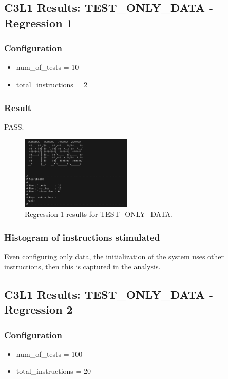 \subsection{C3L1 Results: TEST\_ONLY\_DATA - Regression 1}

\subsubsection{Configuration}

\begin{itemize}
    \item num\_of\_tests = 10
    \item total\_instructions = 2
\end{itemize}

\subsubsection{Result}
PASS.

\begin{figure}[H]
    \centering
    \includegraphics[width=0.47\textwidth]{./c3l1_img/tod_10_r.png}
    \caption{Regression 1 results for TEST\_ONLY\_DATA.}
    \label{fig:tod\_10\_r}
\end{figure}

\subsubsection{Histogram of instructions stimulated}

Even configuring only data, the initialization of the system uses other instructions, then this is captured in the analysis.

\subsection{C3L1 Results: TEST\_ONLY\_DATA - Regression 2}


\subsubsection{Configuration}
\begin{itemize}
    \item num\_of\_tests = 100
    \item total\_instructions = 20
\end{itemize}

